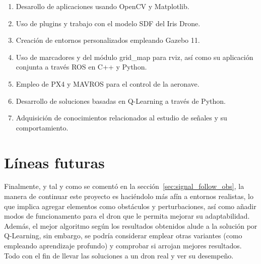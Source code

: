 \begin{enumerate}
    \item Desarollo de aplicaciones usando OpenCV y Matplotlib.    
    \item Uso de plugins y trabajo con el modelo SDF del Iris Drone.    
    \item Creación de entornos personalizados empleando Gazebo 11.    
    \item Uso de marcadores y del módulo grid\_map para rviz, así como su aplicación conjunta a través ROS en C++ y Python.
    \item Empleo de PX4 y MAVROS para el control de la aeronave.    
    \item Desarrollo de soluciones basadas en Q-Learning a través de Python.    
    \item Adquisición de conocimientos relacionados al estudio de señales y su comportamiento.
\end{enumerate}

\section{Líneas futuras}
\label{sec:lineas_futuras}

Finalmente, y tal y como se comentó en la sección~\ref{sec:signal_follow_obs}, la manera de continuar este proyecto es haciéndolo más afín a entornos realistas, lo que implica agregar elementos como obstáculos y perturbaciones, así como añadir modos de funcionamento para el dron que le permita mejorar su adaptabilidad.\\

Además, el mejor algoritmo según los resultados obtenidos alude a la solución por Q-Learning, sin embargo, se podría considerar emplear otras variantes (como empleando aprendizaje profundo) y comprobar si arrojan mejores resultados. Todo con el fin de llevar las soluciones a un dron real y ver su desempeño.